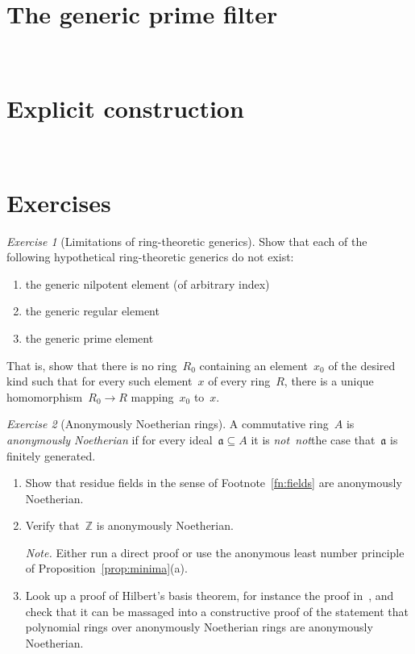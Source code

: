 \documentclass[10pt,reqno,a4paper,openany]{amsbook}
\theoremstyle{definition}
\theoremstyle{plain}
\theoremstyle{remark}
\newcommand{\ZZ}{\mathbb{Z}}
\newcommand{\aaa}{\mathfrak{a}}
\newcommand{\?}{\,{:}\,}
\renewcommand{\_}{\mathpunct{.}\,}
\newtheorem{exercise}{Exercise}[chapter]
\newcommand{\notnot}{\emph{not~not}}
\begin{document}
\section{The generic prime filter}
\newpage
\ \newpage

\section{Explicit construction}
\newpage
\ \newpage

\section{Exercises}

\begin{exercise}[Limitations of ring-theoretic generics]
Show that each of the following hypothetical ring-theoretic generics do not
exist:
\begin{enumerate}
\item the generic nilpotent element (of arbitrary index)
\item the generic regular element
\item the generic prime element
\end{enumerate}
That is, show that there is no ring~$R_0$ containing an element~$x_0$ of the
desired kind such that for every such element~$x$ of every ring~$R$, there is a
unique homomorphism~$R_0 \to R$ mapping~$x_0$ to~$x$.
\end{exercise}

\begin{exercise}[Anonymously Noetherian rings]
A commutative ring~$A$ is \emph{anonymously Noetherian} if for every
ideal~$\aaa \subseteq A$ it is \notnot the case that~$\aaa$ is finitely
generated.
\begin{enumerate}
\item Show that residue fields in the sense of Footnote~\ref{fn:fields} are
anonymously Noetherian.
\item Verify that~$\ZZ$ is anonymously Noetherian.

{\noindent\scriptsize\emph{Note.} Either run a direct proof or use the
anonymous least number principle of Proposition~\ref{prop:minima}(a).\par}
\item Look up a proof of Hilbert's basis theorem, for instance the
proof in~\cite[Theorem~7.5]{atiyah-macdonald:commutative-algebra}, and check
that it can be massaged into a constructive proof of the statement that
polynomial rings over anonymously Noetherian rings are anonymously Noetherian.
\end{enumerate}
\end{exercise}
\end{document}
